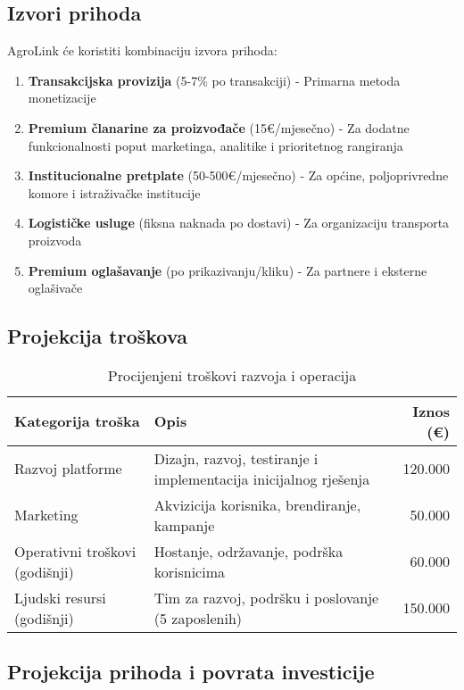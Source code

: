\documentclass[a4paper,12pt]{article}
\begin{document}
\subsection{Izvori prihoda}

AgroLink će koristiti kombinaciju izvora prihoda:

\begin{enumerate}
    \item \textbf{Transakcijska provizija} (5-7\% po transakciji) - Primarna metoda monetizacije
    \item \textbf{Premium članarine za proizvođače} (15€/mjesečno) - Za dodatne funkcionalnosti poput marketinga, analitike i prioritetnog rangiranja
    \item \textbf{Institucionalne pretplate} (50-500€/mjesečno) - Za općine, poljoprivredne komore i istraživačke institucije
    \item \textbf{Logističke usluge} (fiksna naknada po dostavi) - Za organizaciju transporta proizvoda
    \item \textbf{Premium oglašavanje} (po prikazivanju/kliku) - Za partnere i eksterne oglašivače
\end{enumerate}

\subsection{Projekcija troškova}

\begin{table}[H]
\centering
\caption{Procijenjeni troškovi razvoja i operacija}
\begin{tabularx}{\textwidth}{|l|X|r|}
\hline
\textbf{Kategorija troška} & \textbf{Opis} & \textbf{Iznos (€)} \\
\hline
Razvoj platforme & Dizajn, razvoj, testiranje i implementacija inicijalnog rješenja & 120.000 \\
\hline
Marketing & Akvizicija korisnika, brendiranje, kampanje & 50.000 \\
\hline
Operativni troškovi (godišnji) & Hostanje, održavanje, podrška korisnicima & 60.000 \\
\hline
Ljudski resursi (godišnji) & Tim za razvoj, podršku i poslovanje (5 zaposlenih) & 150.000 \\
\hline
\end{tabularx}
\end{table}

\subsection{Projekcija prihoda i povrata investicije}
\end{document}
